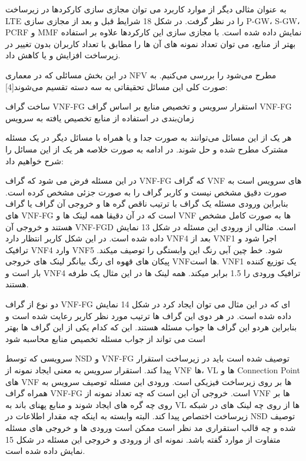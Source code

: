 \documentclass{book}
\begin{document}
 به عنوان مثالی دیگر از موارد کاربرد می توان مجازی سازی کارکردها در زیرساخت LTE را در نظر گرفت. در شکل 18 شرایط قبل و بعد از مجازی سازی P-GW، S-GW، PCRF و MMF نمایش داده شده است. با مجازی سازی این کارکردها علاوه بر استفاده بهتر از منابع، می توان تعداد نمونه های آن ها را مطابق با تعداد کاربران بدون تغییر در زیرساخت افزایش و یا کاهش داد.


در این بخش مسائلی که در معماری NFV مطرح می‌شود را بررسی می‌کنیم. به صورت کلی این مسائل تحقیقاتی به سه دسته تقسیم می‌شوند[4]:


 ساخت گراف VNF-FG
 استقرار سرویس و تخصیص منابع بر اساس گراف VNF-FG
 زمان‌بندی در استفاده از منابع تخصیص یافته به سرویس

هر یک از این مسائل می‌توانند به صورت جدا و یا همراه با مسائل دیگر در یک مسئله مشترک مطرح شده و حل شوند. در ادامه به صورت خلاصه هر یک از این مسائل را شرح خواهیم داد:


در این مسئله فرض می شود که گراف VNF-FG که گراف VNF های سرویس است به صورت دقیق مشخص نیست و کاربر گراف را به صورت جزئی مشخص کرده است. بنابراین ورودی مسئله یک گراف با ترتیب ناقص گره ها و خروجی آن گراف یا گراف های VNF-FG است که در آن دقیقا همه لینک ها و VNF ها به صورت کامل مشخص هستند و خروجی آن VNF-FGD است. مثالی از ورودی این مسئله در شکل 13 نمایش داده شده است. در این شکل کاربر انتظار دارد VNF4 بعد از VNF1 اجرا شود و ترافیک VNF4 وارد VNF5 شود. خط چین آبی رنگ این وابستگی را توصیف میکند. پیکان های قهوه ای رنگ بیانگر لینک های خروجی VNFها است. VNF1 یک توزیع کننده بار است و VNF4 ترافیک ورودی را 1.5 برابر میکند. همه لینک ها در این مثال یک طرفه هستند.

دو نوع از گراف VNF-FG ای که در این مثال می توان ایجاد کرد در شکل 14 نمایش داده شده است. در هر دوی این گراف ها ترتیب مورد نظر کاربر رعایت شده است و بنابراین هردو این گراف ها جواب مسئله هستند. این که کدام یکی از این گراف ها بهتر است می تواند از جواب مسئله تخصیص منابع محاسبه شود


سرویسی که توسط NSD و VNF-FG توصیف شده است باید در زیرساخت استقرار پیدا کند. استقرار سرویس به معنی ایجاد نمونه از VNF ها، VL ها و Connection Point های VNF ها بر روی زیرساخت فیزیکی است. ورودی این مسئله توصیف سرویس به همراه گراف VNF-FG است. خروجی آن این است که چه تعداد نمونه از VNF ها بر روی چه گره های ایجاد شوند و منابع پهنای باند به VL ها از روی چه  لینک های در شبکه زیرساخت اختصاص پیدا کند. البته وابسته به اینکه چه مقدار اطلاعات در NSD توصیف شده و چه قالب استقراری مد نظر است ممکن است ورودی ها و خروجی های مسئله متفاوت از موارد گفته باشد. نمونه ای از ورودی و خروجی این مسئله در شکل 15 نمایش داده شده است.
\end{document}
